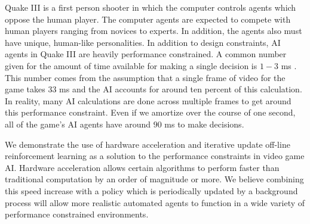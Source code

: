 Quake III is a first person shooter in which the computer controls agents which oppose the human player. The computer agents are expected to compete with human players ranging from novices to experts. In addition, the agents also must have unique, human-like personalities. In addition to design constraints, AI agents in Quake III are heavily performance constrained. A common number given for the amount of time available for making a single decision is $1-3$ ms \cite{game:ai:lecture}. This number comes from the assumption that a single frame of video for the game takes $33$ ms and the AI accounts for around ten percent of this calculation. In reality, many AI calculations are done across multiple frames to get around this performance constraint. Even if we amortize over the course of one second, all of the game's AI agents have around $90$ ms to make decisions.

We demonstrate the use of hardware acceleration and iterative update off-line reinforcement learning as a solution to the performance constraints in video game AI. Hardware acceleration allows certain algorithms to perform faster than traditional computation by an order of magnitude or more. We believe combining this speed increase with a policy which is periodically updated by a background process will allow more realistic automated agents to function in a wide variety of performance constrained environments.